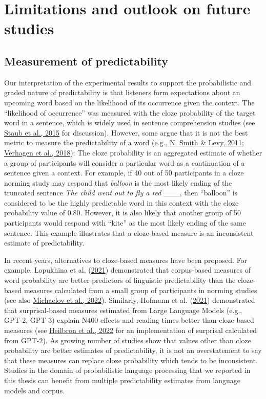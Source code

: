 \documentclass[a4paper, nobind]{templates/ociamthesis}
\begin{document}
\hypertarget{limitations-and-outlook-on-future-studies}{%
\section{Limitations and outlook on future studies}\label{limitations-and-outlook-on-future-studies}}

\hypertarget{measurement-of-predictability}{%
\subsection{Measurement of predictability}\label{measurement-of-predictability}}

Our interpretation of the experimental results to support the probabilistic and graded nature of predictability is that listeners form expectations about an upcoming word based on the likelihood of its occurrence given the context.
The ``likelihood of occurrence'' was measured with the cloze probability of the target word in a sentence,
which is widely used in sentence comprehension studies (see \protect\hyperlink{ref-Staub2015a}{Staub et al., 2015} for discussion).
However, some argue that it is not the best metric to measure the predictability of a word (e.g., \protect\hyperlink{ref-Smith2011}{N. Smith \& Levy, 2011}; \protect\hyperlink{ref-Verhagen2018}{Verhagen et al., 2018}):
The cloze probability is an aggregated estimate of whether a group of participants will consider a particular word as a continuation of a sentence given a context.
For example, if 40 out of 50 participants in a cloze norming study may respond that \emph{balloon} is the most likely ending of the truncated sentence \emph{The child went out to fly a red} \_\_\_,
then ``balloon'' is considered to be the highly predictable word in this context with the cloze probability value of 0.80.
However, it is also likely that another group of 50 participants would respond with ``kite'' as the most likely ending of the same sentence.
This example illustrates that a cloze-based measure is an inconsistent estimate of predictability.

In recent years, alternatives to cloze-based measures have been proposed.
For example, Lopukhina et al. (\protect\hyperlink{ref-Lopukhina2021}{2021}) demonstrated that corpus-based measures of word probability are better predictors of linguistic predictability than the cloze-based measures calculated from a small group of participants in norming studies (see also \protect\hyperlink{ref-Michaelov2022}{Michaelov et al., 2022}).
Similarly, Hofmann et al. (\protect\hyperlink{ref-Hofmann2021}{2021}) demonstrated that surprisal-based measures estimated from Large Language Models (e.g., GPT-2, GPT-3) explain N400 effects and reading times better than cloze-based measures (see \protect\hyperlink{ref-Heilbron2022}{Heilbron et al., 2022} for an implementation of surprisal calculated from GPT-2).
As growing number of studies show that values other than cloze probability are better estimates of predictability,
it is not an overstatement to say that these measures can replace cloze probability which tends to be inconsistent.
Studies in the domain of probabilistic language processing that we reported in this thesis can benefit from multiple predictability estimates from language models and corpus.
\end{document}
